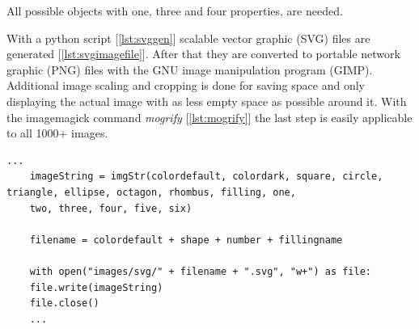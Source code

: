All possible objects with one, three and four properties, are needed.

With a python script [\ref{lst:svggen}] scalable vector graphic (SVG)\cite{svg-tutorial} files are generated [\ref{lst:svgimagefile}].
After that they are converted to portable network graphic (PNG) files with the GNU image manipulation program (GIMP)\cite{gimp}.
Additional image scaling and cropping is done for saving space and only displaying the actual image with as less empty space as possible around it.
With the imagemagick command \textit{mogrify} [\ref{lst:mogrify}] the last step is easily applicable to all 1000+ images.

\begin{lstlisting}[style=TypeScript, caption={SVG Generation}, label={lst:svggen}]
    ...
    imageString = imgStr(colordefault, colordark, square, circle, triangle, ellipse, octagon, rhombus, filling, one,
    two, three, four, five, six)

    filename = colordefault + shape + number + fillingname

    with open("images/svg/" + filename + ".svg", "w+") as file:
    file.write(imageString)
    file.close()
    ...
\end{lstlisting}

